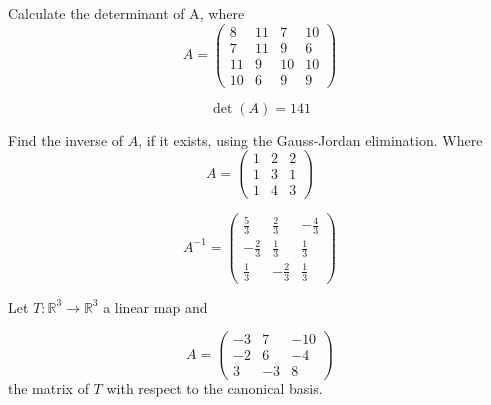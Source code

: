 \begin{questions}

\question Calculate the determinant of A, where
$$
A=\left(\begin{array}{rrrr}
8 & 11 & 7 & 10 \\
7 & 11 & 9 & 6 \\
11 & 9 & 10 & 10 \\
10 & 6 & 9 & 9
\end{array}\right)
$$

\begin{solution}
$$\det(A)=141$$
\end{solution}

\question Find the inverse of $A$, if it exists, using the Gauss-Jordan elimination. Where
$$
A=\left(\begin{array}{rrr}
1 & 2 & 2 \\
1 & 3 & 1 \\
1 & 4 & 3
\end{array}\right)
$$

\begin{solution}
$$A^{-1}=\left(\begin{array}{rrr}
\frac{5}{3} & \frac{2}{3} & -\frac{4}{3} \\
-\frac{2}{3} & \frac{1}{3} & \frac{1}{3} \\
\frac{1}{3} & -\frac{2}{3} & \frac{1}{3}
\end{array}\right)$$
\end{solution}

\question Let $T:\mathbb{R}^3\rightarrow\mathbb{R}^3$  a linear map and
 
$$
A=\left(\begin{array}{rrr}
-3 & 7 & -10 \\
-2 & 6 & -4 \\
3 & -3 & 8
\end{array}\right)
$$
the matrix of $T$ with respect to the canonical basis.
\end{questions}
